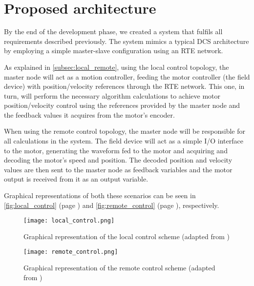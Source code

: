 \section{Proposed architecture} \label{sec:proposed-arch}

By the end of the development phase, we created a system that fulfils all requirements described previously.
The system mimics a typical DCS architecture by employing a simple master-slave configuration using an RTE network.

As explained in \autoref{subsec:local_remote}, using the local control topology, the master node will act as a motion controller, feeding the motor controller (the field device) with position/velocity references through the RTE network.
This one, in turn, will perform the necessary algorithm calculations to achieve motor position/velocity control using the references provided by the master node and the feedback values it acquires from the motor's encoder.

When using the remote control topology, the master node will be responsible for all calculations in the system.
The field device will act as a simple I/O interface to the motor, generating the waveform fed to the motor and acquiring and decoding the motor's speed and position.
The decoded position and velocity values are then sent to the master node as feedback variables and the motor output is received from it as an output variable.

Graphical representations of both these scenarios can be seen in \autoref{fig:local_control} (page \pageref{fig:local_control}) and \autoref{fig:remote_control} (page \pageref{fig:remote_control}), respectively. 


\begin{figure}[t]
	\centering
	\texttt{[image: local\_control.png]}
	\caption{Graphical representation of the local control scheme (adapted from \cite{rte:motion-control-over-rte})}
	\label{fig:local_control}
\end{figure}

\begin{figure}[t]
	\centering
	\texttt{[image: remote\_control.png]}
	\caption{Graphical representation of the remote control scheme (adapted from \cite{rte:motion-control-over-rte})}
	\label{fig:remote_control}
\end{figure}





